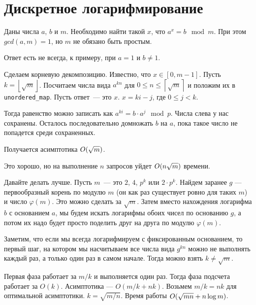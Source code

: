 \chapter{Дискретное логарифмирование}

Даны числа $a$, $b$ и $m$. Необходимо найти такой $x$, что $a^x = b \mod m$. При этом $gcd(a, m) = 1$, но $m$ не обязано быть простым.

Ответ есть не всегда, к примеру, при $a = 1$ и $b \neq 1$.

Сделаем корневую декомпозицию. Известно, что $x \in [0, m - 1]$. Пусть $k = \left\lfloor \sqrt{m} \right\rfloor$. Посчитаем числа вида $a^{k n}$ для $0 \le n \le \left\lceil \sqrt{m} \right\rceil $ и положим их в \verb+unordered_map+. Пусть ответ~--- это $x$. $x = ki - j$, где $0 \le j < k$.

Тогда равенство можно записать как $a^{ki} = b \cdot a^j \mod p$. Числа слева у нас сохранены. Осталось последовательно домножать $b$ на $a$, пока такое число не попадется среди сохраненных.

Получается асимптотика $O(\sqrt{m})$.

Это хорошо, но на выполнение $n$ запросов уйдет $O(n \sqrt{m})$ времени.

Давайте делать лучше. Пусть $m$~--- это $2$, $4$, $p^k$ или $2 \cdot p^k$. Найдем заранее $g$ — первообразный корень по модулю $m$ (он как раз существует ровно для таких $m$) и число $\varphi(m)$. Это можно сделать за $\sqrt{m}$. Затем вместо нахождения логарифма $b$ с основанием $a$, мы будем искать логарифмы обоих чисел по основанию $g$, а потом их надо будет просто поделить друг на друга по модулю $\varphi(m)$.

Заметим, что если мы всегда логарифмируем с фиксированным основанием, то первый шаг, на котором мы насчитываем все числа вида $g^{kn}$ можно не выполнять каждый раз, а только один раз в самом начале. Тогда можно взять $k \neq \sqrt{m}$.

Первая фаза работает за $m / k$ и выполняется один раз. Тогда фаза подсчета работает за $O(k)$. Асимптотика — $O(m/k + nk)$. Возьмем $m/k = nk$ для оптимальной асимптотики. $k = \sqrt{m/n}$. Время работы $O(\sqrt{mn} + n \log m)$.
